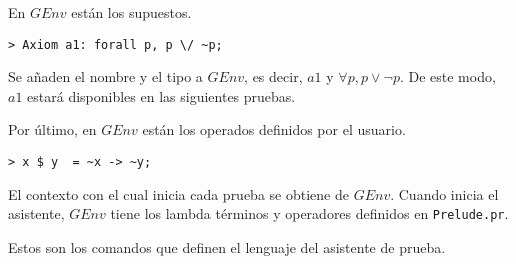 \documentclass[a4paper,11pt]{article}
\theoremstyle{definition}
\theoremstyle{remark}
\begin{document}
En $GEnv$ están los supuestos.

\begin{verbatim}
> Axiom a1: forall p, p \/ ~p;
\end{verbatim}

Se añaden el nombre y el tipo a $GEnv$, es decir, $a1$ y $\forall p, p \vee \neg p$.
De este modo, $a1$ estará disponibles en las siguientes pruebas.

Por último, en $GEnv$ están los operados definidos por el usuario.

\begin{verbatim}
> x $ y  = ~x -> ~y;
\end{verbatim}

El contexto con el cual inicia cada prueba se obtiene de $GEnv$. Cuando inicia el asistente, $GEnv$ tiene los lambda términos
y operadores definidos en \texttt{Prelude.pr}.

Estos son los comandos que definen el lenguaje del asistente de prueba.
\end{document}
